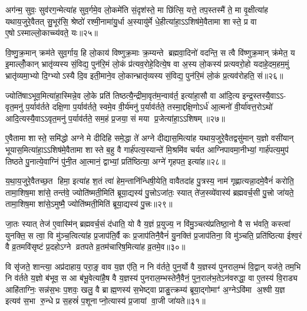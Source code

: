 {\anuvakamend[{इत्ये॒तद॑वभृ॒थो दिशः॑ स॒प्त च॑॥५॥}]}

अग॑न्म॒ सुवः॒ सुव॑रग॒न्मेत्या॑ह सुव॒र्गमे॒व लो॒कमे॑ति सं॒दृश॑स्ते॒ मा छि॑त्सि॒ यत्ते॒ तप॒स्तस्मै॑ ते॒ मा वृ॒क्षीत्या॑ह यथाय॒जुरे॒वैतत् सु॒भूर॑सि॒ श्रेष्ठो॑ रश्मी॒नामा॑यु॒र्धा अ॒स्यायु॑र्मे धे॒हीत्या॑हा॒ऽऽशिष॑मे॒वैतामा शास्ते॒ प्र वा ए॒षोऽस्माल्लो॒काच्च्य॑वते॒ यः॥२५॥

वि॒ष्णु॒क्र॒मान् क्रम॑ते सुव॒र्गाय॒ हि लो॒काय॑ विष्णुक्र॒माः क्र॒म्यन्ते ब्रह्मवा॒दिनो॑ वदन्ति॒ स त्वै वि॑ष्णुक्र॒मान् क्र॑मेत॒ य इ॒माल्लोँ॒कान् भ्रातृ॑व्यस्य सं॒विद्य॒ पुन॑रि॒मं लो॒कं प्र॑त्यव॒रोहे॒दित्ये॒ष वा अ॒स्य लो॒कस्य॑ प्रत्यवरो॒हो यदाहे॒दम॒हम॒मुं भ्रातृ॑व्यमा॒भ्यो दि॒ग्भ्योऽस्यै दि॒व इती॒माने॒व लो॒कान्भ्रातृ॑व्यस्य सं॒विद्य॒ पुन॑रि॒मं लो॒कं प्र॒त्यव॑रोहति॒ सं॥२६॥

ज्योति॑षाऽभूव॒मित्या॑हा॒स्मिन्ने॒व लो॒के प्रति॑ तिष्ठत्यै॒न्द्रीमा॒वृत॑म॒न्वाव॑र्त॒ इत्या॑हा॒सौ वा आ॑दि॒त्य इन्द्र॒स्तस्यै॒वाऽऽ- वृत॒मनु॑ प॒र्याव॑र्तते दक्षि॒णा प॒र्याव॑र्तते॒ स्वमे॒व वी॒र्य॑मनु॑ प॒र्याव॑र्तते॒ तस्मा॒द्दक्षि॒णोऽर्ध॑ आ॒त्मनो॑ वी॒र्या॑वत्त॒रोऽथो॑ आदि॒त्यस्यै॒वाऽऽवृत॒मनु॑ प॒र्याव॑र्तते॒ सम॒हं प्र॒जया॒ सं मया प्र॒जेत्या॑हा॒ऽऽशिषम्॥२७॥

ए॒वैतामा शास्ते॒ समि॑द्धो अग्ने मे दीदिहि समे॒द्धा ते॑ अग्ने दीद्यास॒मित्या॑ह यथाय॒जुरे॒वैतद्वसु॑मान् य॒ज्ञो वसी॑यान् भूयास॒मित्या॑हा॒ऽऽशिष॑मे॒वैतामा शास्ते ब॒हु वै गार्\mbox{}ह॑पत्य॒स्यान्ते॑ मि॒श्रमि॑व चर्यत आग्निपावमा॒नीभ्यां॒ गार्\mbox{}ह॑पत्य॒मुप॑ तिष्ठते पु॒नात्ये॒वाग्निं पु॑नी॒त आ॒त्मानं॒ द्वाभ्यां॒ प्रति॑ष्ठित्या॒ अग्ने॑ गृहपत॒ इत्या॑ह॥२८॥

य॒था॒य॒जुरे॒वैतच्छ॒त हिमा॒ इत्या॑ह श॒तं त्वा॑ हेम॒न्तानि॑न्धिषी॒येति॒ वावैतदा॑ह पु॒त्रस्य॒ नाम॑ गृह्णात्यन्ना॒दमे॒वैनं॑ करोति॒ तामा॒शिष॒मा शा॑से॒ तन्त॑वे॒ ज्योति॑ष्मती॒मिति॑ ब्रूया॒द्यस्य॑ पु॒त्त्रोऽजा॑तः॒ स्यात् ते॑ज॒स्व्ये॑वास्य॑ ब्रह्मवर्च॒सी पु॒त्त्रो जा॑यते॒ तामा॒शिष॒मा शा॑से॒ऽमुष्मै॒ ज्योति॑ष्मती॒मिति॑ ब्रूया॒द्यस्य॑ पु॒त्त्रः॥२९॥

जा॒तः स्यात् तेज॑ ए॒वास्मि॑न् ब्रह्मवर्च॒सं द॑धाति॒ यो वै य॒ज्ञं प्र॒युज्य॒ न वि॑मु॒ञ्चत्य॑प्रतिष्ठा॒नो वै स भ॑वति॒ कस्त्वा॑ युनक्ति॒ स त्वा॒ वि मु॑ञ्च॒त्वित्या॑ह प्र॒जाप॑ति॒र्वै कः प्र॒जाप॑तिनै॒वैनं॑ यु॒नक्ति॑ प्र॒जाप॑तिना॒ वि मु॑ञ्चति॒ प्रति॑ष्ठित्या ईश्व॒रं वै व्र॒तमवि॑सृष्टं प्र॒दहोऽग्ने व्रतपते व्र॒तम॑चारिष॒मित्या॑ह व्र॒तमे॒व॥३०॥

वि सृ॑जते॒ शान्त्या॒ अप्र॑दाहाय॒ परा॒ङ्॒ वाव य॒ज्ञ ए॑ति॒ न नि व॑र्तते॒ पुन॒र्यो वै य॒ज्ञस्य॑ पुनराल॒म्भं वि॒द्वान् यज॑ते॒ तम॒भि नि व॑र्तते य॒ज्ञो ब॑भूव॒ स आ ब॑भू॒वेत्या॑है॒ष वै य॒ज्ञस्य॑ पुनराल॒म्भस्तेनै॒वैनं॒ पुन॒राल॑भ॒तेऽन॑वरुद्धा॒ वा ए॒तस्य॑ वि॒राड्य आहि॑ताग्निः॒ सन्न॑स॒भः प॒शवः॒ खलु॒ वै ब्राह्म॒णस्य॑ स॒भेष्ट्वा प्राङु॒त्क्रम्य॑ ब्रूया॒द्गोमाꣳ॑ अ॒ग्नेऽवि॑मा अ॒श्वी य॒ज्ञ इत्यव॑ स॒भा रु॒न्धे प्र स॒हस्रं॑ प॒शूनाप्नो॒त्यास्य॑ प्र॒जायां वा॒जी जा॑यते॥३१॥

